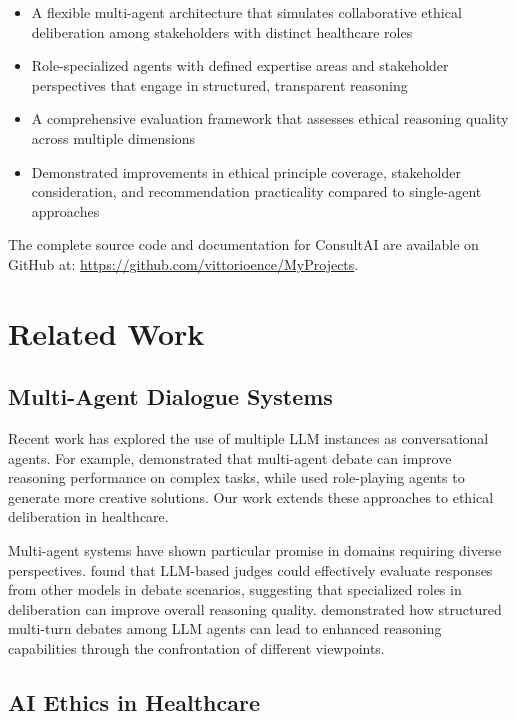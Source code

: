 \documentclass[11pt]{article}
\begin{document}
\begin{itemize}
    \item A flexible multi-agent architecture that simulates collaborative ethical deliberation among stakeholders with distinct healthcare roles
    \item Role-specialized agents with defined expertise areas and stakeholder perspectives that engage in structured, transparent reasoning
    \item A comprehensive evaluation framework that assesses ethical reasoning quality across multiple dimensions
    \item Demonstrated improvements in ethical principle coverage, stakeholder consideration, and recommendation practicality compared to single-agent approaches
\end{itemize}

The complete source code and documentation for ConsultAI are available on GitHub at: \url{https://github.com/vittorioence/MyProjects}.

\section{Related Work}

\subsection{Multi-Agent Dialogue Systems}

Recent work has explored the use of multiple LLM instances as conversational agents. For example, \citet{chan2023chateval} demonstrated that multi-agent debate can improve reasoning performance on complex tasks, while \citet{park2023generative} used role-playing agents to generate more creative solutions. Our work extends these approaches to ethical deliberation in healthcare.

Multi-agent systems have shown particular promise in domains requiring diverse perspectives. \citet{zheng2023judging} found that LLM-based judges could effectively evaluate responses from other models in debate scenarios, suggesting that specialized roles in deliberation can improve overall reasoning quality. \citet{bang2023multiturn} demonstrated how structured multi-turn debates among LLM agents can lead to enhanced reasoning capabilities through the confrontation of different viewpoints.

\subsection{AI Ethics in Healthcare}
\end{document}
